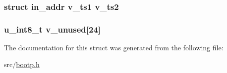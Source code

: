 \subsubsection[{\texorpdfstring{v\+\_\+ts2}{v_ts2}}]{\setlength{\rightskip}{0pt plus 5cm}struct in\+\_\+addr v\+\_\+ts1 v\+\_\+ts2}\hypertarget{structcmu__vend_a15156a832524a1ba3d60b1fcad77677e}{}\label{structcmu__vend_a15156a832524a1ba3d60b1fcad77677e}
\subsubsection[{\texorpdfstring{v\+\_\+unused}{v_unused}}]{\setlength{\rightskip}{0pt plus 5cm}u\+\_\+int8\+\_\+t v\+\_\+unused\mbox{[}24\mbox{]}}\hypertarget{structcmu__vend_aebf325713cf0b54c5f174d636edd2757}{}\label{structcmu__vend_aebf325713cf0b54c5f174d636edd2757}


The documentation for this struct was generated from the following file\+:\begin{DoxyCompactItemize}
\item 
src/\hyperlink{bootp_8h}{bootp.\+h}\end{DoxyCompactItemize}
